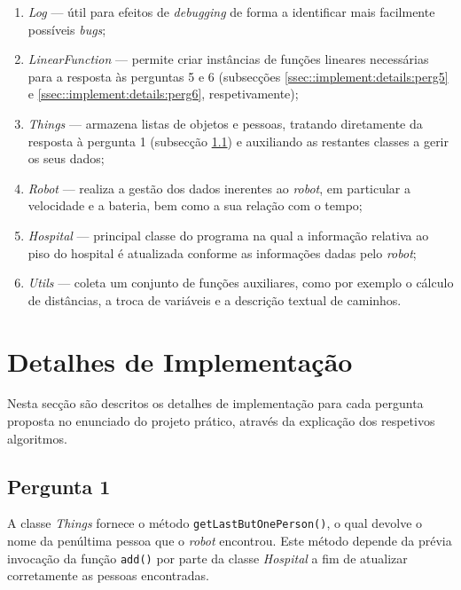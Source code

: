 \begin{enumerate}
	\item \emph{Log} --- útil para efeitos de \emph{debugging} de forma a identificar mais facilmente possíveis \emph{bugs};
	
	\item \emph{LinearFunction} --- permite criar instâncias de funções lineares necessárias para a resposta às perguntas 5 e 6 (subsecções \ref{ssec::implement:details:perg5} e \ref{ssec::implement:details:perg6}, respetivamente);
	
	\item \emph{Things} --- armazena listas de objetos e pessoas, tratando diretamente da resposta à pergunta 1 (subsecção \ref{ssec::implement:details:perg1}) e auxiliando as restantes classes a gerir os seus dados;
	
	\item \emph{Robot} --- realiza a gestão dos dados inerentes ao \textit{robot}, em particular a velocidade e a bateria, bem como a sua relação com o tempo;
	
	\item \emph{Hospital} --- principal classe do programa na qual a informação relativa ao piso do hospital é atualizada conforme as informações dadas pelo \emph{robot};
	
	\item \emph{Utils} --- coleta um conjunto de funções auxiliares, como por exemplo o cálculo de distâncias, a troca de variáveis e a descrição textual de caminhos.
\end{enumerate}


\section{Detalhes de Implementação}
\label{sec::implement:details}

Nesta secção são descritos os detalhes de implementação para cada pergunta proposta no enunciado do projeto prático, através da explicação dos respetivos algoritmos.


\subsection{Pergunta 1}
\label{ssec::implement:details:perg1}


A classe \textit{Things} fornece o método \texttt{getLastButOnePerson()}, o qual devolve o nome da penúltima pessoa que o \textit{robot} encontrou. Este método depende da prévia invocação da função \texttt{add()} por parte da classe \textit{Hospital} a fim de atualizar corretamente as pessoas encontradas.

